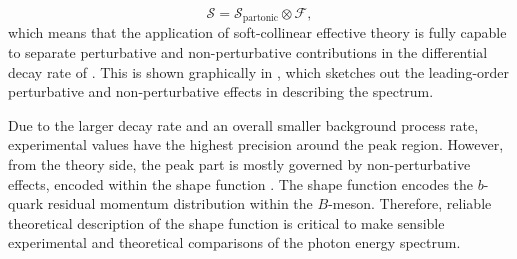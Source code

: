 \begin{equation}\label{eq:factorisation}
    \mathcal{S} = \mathcal{S}_{\mathrm{partonic}} \otimes \mathcal{F},
\end{equation}
which means that the application of soft-collinear effective theory is fully capable to separate perturbative and non-perturbative contributions in the differential decay rate of \BtoXsgamma.
This is shown graphically in , which sketches out the leading-order perturbative and non-perturbative effects in describing the \BtoXsgamma spectrum.

Due to the larger \BtoXsgamma decay rate and an overall smaller background process rate, experimental values have the highest precision around the peak region.
However, from the theory side, the peak part is mostly governed by non-perturbative effects, encoded within the shape function \cite{Ligeti:2008ac}.
The shape function encodes the $b$-quark residual momentum distribution within the $B$-meson. 
Therefore, reliable theoretical description of the shape function is critical to make sensible experimental and theoretical comparisons of the photon energy spectrum. 

